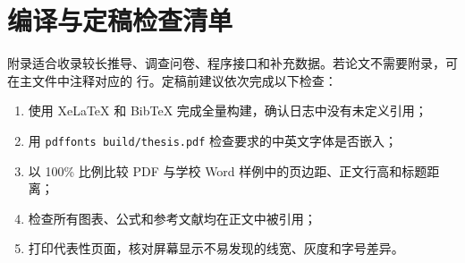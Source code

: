 \chapter{编译与定稿检查清单}

附录适合收录较长推导、调查问卷、程序接口和补充数据。若论文不需要附录，可在主文件中注释对应的 \verb|| 行。定稿前建议依次完成以下检查：

\begin{enumerate}
  \item 使用 XeLaTeX 和 BibTeX 完成全量构建，确认日志中没有未定义引用；
  \item 用 \verb|pdffonts build/thesis.pdf| 检查要求的中英文字体是否嵌入；
  \item 以 100\% 比例比较 PDF 与学校 Word 样例中的页边距、正文行高和标题距离；
  \item 检查所有图表、公式和参考文献均在正文中被引用；
  \item 打印代表性页面，核对屏幕显示不易发现的线宽、灰度和字号差异。
\end{enumerate}
